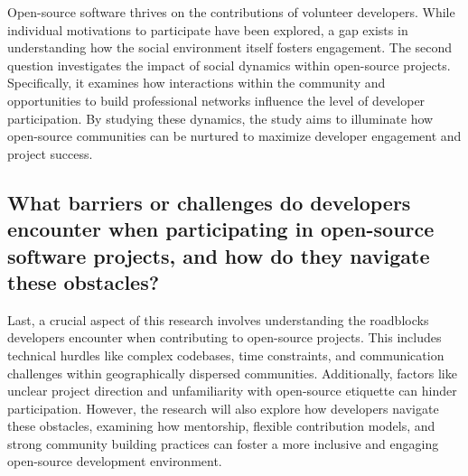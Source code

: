 Open-source software thrives on the contributions of volunteer developers. While individual motivations to participate have been explored, a gap exists in understanding how the social environment itself fosters engagement. The second question investigates the impact of social dynamics within open-source projects. Specifically, it examines how interactions within the community and opportunities to build professional networks influence the level of developer participation. By studying these dynamics, the study aims to illuminate how open-source communities can be nurtured to maximize developer engagement and project success. 


\subsection{What barriers or challenges do developers encounter when participating in open-source software projects, and how do they navigate these obstacles?}

Last, a crucial aspect of this research involves understanding the roadblocks developers encounter when contributing to open-source projects. This includes technical hurdles like complex codebases, time constraints, and communication challenges within geographically dispersed communities. Additionally, factors like unclear project direction and unfamiliarity with open-source etiquette can hinder participation. However, the research will also explore how developers navigate these obstacles, examining how mentorship, flexible contribution models, and strong community building practices can foster a more inclusive and engaging open-source development environment.


\clearpage  %
